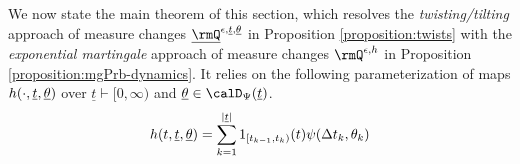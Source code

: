 We now state the main theorem of this section, which resolves the \emph{twisting/tilting} approach of measure changes $\fddPrb^{\epsilon,\underline t,\underline\twistVar}$ in Proposition \ref{proposition:twists} with the \emph{exponential martingale} approach of measure changes $\mgPrb^{\epsilon,\twistFunc}$ in Proposition \ref{proposition:mgPrb-dynamics}.
It relies on the following parameterization of maps $h(\cdot,\underline t, \underline{\theta})$ over $\underline t \vdash [0,\infty)$ and $\underline\twistVar \in \momentSpace(\underline t)$.
\begin{equation}
  \label{eq:resolve-twists}
  h(t, \underline t, \underline{\theta}) = \sum_{k=1}^{|\underline t|} 1_{[t_{k-1},t_k)}(t) \psi(\Delta t_k, \theta_k) 
\end{equation}




